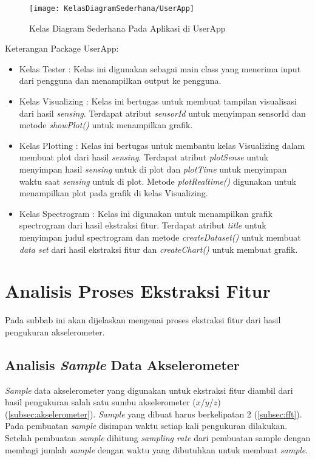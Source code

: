 \begin{figure} [H]
	\centering  
	\texttt{[image: KelasDiagramSederhana/UserApp]}  
	\caption[Kelas Diagram Sederhana Pada Aplikasi di UserApp]{Kelas Diagram Sederhana Pada Aplikasi di UserApp} 
	\label{fig:UserApp} 
\end{figure} 

Keterangan Package UserApp:
\begin{itemize}
	\item Kelas Tester : Kelas ini digunakan sebagai main class yang menerima input dari pengguna dan menampilkan output ke pengguna.
	\item Kelas Visualizing : Kelas ini bertugas untuk membuat tampilan visualisasi dari hasil {\it sensing}. Terdapat atribut {\it sensorId} untuk menyimpan sensorId dan metode {\it showPlot()} untuk menampilkan grafik.
	\item Kelas Plotting : Kelas ini bertugas untuk membantu kelas Visualizing dalam membuat plot dari hasil {\it sensing}. Terdapat atribut {\it plotSense} untuk menyimpan hasil {\it sensing} untuk di plot dan {\it plotTime} untuk menyimpan waktu saat {\it sensing} untuk di plot. Metode {\it plotRealtime()} digunakan untuk menampilkan plot pada grafik di kelas Visualizing.
	\item Kelas Spectrogram : Kelas ini digunakan untuk menampilkan grafik spectrogram dari hasil ekstraksi fitur. Terdapat atribut {\it title} untuk menyimpan judul spectrogram dan metode {\it createDataset()} untuk membuat {\it data set} dari hasil ekstraksi fitur dan {\it createChart()} untuk membuat grafik.
\end{itemize}


\section{Analisis Proses Ekstraksi Fitur}
\label{sec:analisisProses}
Pada subbab ini akan dijelaskan mengenai proses ekstraksi fitur dari hasil pengukuran akselerometer. 

\subsection{Analisis {\it Sample} Data Akselerometer}
\label{subsec:sample}
{\it Sample} data akselerometer yang digunakan untuk ekstraksi fitur diambil dari hasil pengukuran salah satu sumbu akselerometer ($x$/$y$/$z$) (\ref{subsec:akselerometer}). {\it Sample} yang dibuat harus berkelipatan 2 (\ref{subsec:fft}). Pada pembuatan {\it sample} disimpan waktu setiap kali pengukuran dilakukan. Setelah pembuatan {\it sample} dihitung {\it sampling rate} dari pembuatan sample dengan membagi jumlah {\it sample} dengan waktu yang dibutuhkan untuk membuat {\it sample}.

